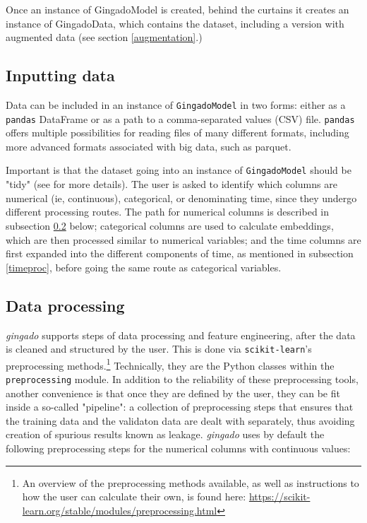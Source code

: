 \documentclass{article}
\begin{document}
Once an instance of GingadoModel is created, behind the curtains it creates an instance of GingadoData, which contains the dataset, including a version with augmented data (see section \ref{augmentation}.)

\subsection{Inputting data}

Data can be included in an instance of \texttt{GingadoModel} in two forms: either as a \texttt{pandas} DataFrame or as a path to a comma-separated values (CSV) file. \texttt{pandas} offers multiple possibilities for reading files of many different formats, including more advanced formats associated with big data, such as parquet.

Important is that the dataset going into an instance of \texttt{GingadoModel} should be "tidy" (see \cite{TidyData} for more details). The user is asked to identify which columns are numerical (ie, continuous), categorical, or denominating time, since they undergo different processing routes. The path for numerical columns is described in subsection \ref{dataproc} below; categorical columns are used to calculate embeddings, which are then processed similar to numerical variables; and the time columns are first expanded into the different components of time, as mentioned in subsection \ref{timeproc}, before going the same route as categorical variables.


\subsection{Data processing}\label{dataproc}

\textit{gingado} supports steps of data processing and feature engineering, after the data is cleaned and structured by the user. This is done via \texttt{scikit-learn}'s preprocessing methods.\footnote{An overview of the preprocessing methods available, as well as instructions to how the user can calculate their own, is found here: \url{https://scikit-learn.org/stable/modules/preprocessing.html}} Technically, they are the Python classes within the \texttt{preprocessing} module. In addition to the reliability of these preprocessing tools, another convenience is that once they are defined by the user, they can be fit inside a so-called "pipeline": a collection of preprocessing steps that ensures that the training data and the validaton data are dealt with separately, thus avoiding creation of spurious results known as leakage. \textit{gingado} uses by default the following preprocessing steps for the numerical columns with continuous values:
\end{document}

